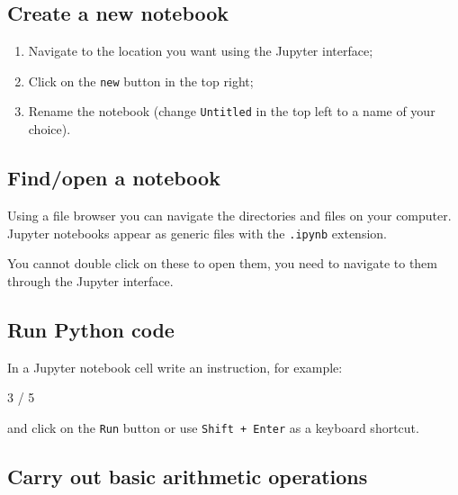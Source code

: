 \subsection{Create a new notebook}
\begin{enumerate}

\item 

Navigate to the location you want using the Jupyter interface;

\item 

Click on the \texttt{new} button in the top right;

\item 

Rename the notebook (change \texttt{Untitled} in the top left to a name of your choice).

\end{enumerate}


\subsection{Find/open a notebook}

Using a file browser you can navigate the directories and files on your
computer. Jupyter notebooks appear as generic files with the \texttt{.ipynb}
extension.


You cannot double click on these to open them, you need to navigate to them through the Jupyter interface.


\subsection{Run Python code}

In a Jupyter notebook cell write an instruction, for example:

\begin{pyin}
3 / 5
\end{pyin}


and click on the \texttt{Run} button or use \texttt{Shift + Enter} as a keyboard shortcut.


\subsection{Carry out basic arithmetic operations}

